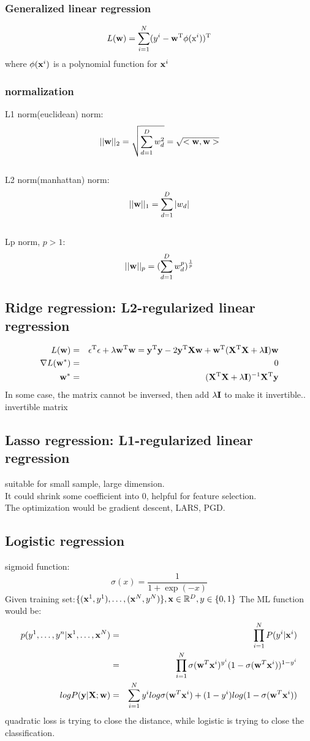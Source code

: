 \documentclass[12pt,a4paper]{article}
\begin{document}
\subsubsection*{Generalized linear regression}
$$
L({\bf w}) = \sum_{i=1}^{N}(y^i-{\bf w}^{\rm T}\phi({\rm x}^i))^{\rm T}
$$
where $\phi({\bf x}^i)$ is a polynomial function for ${\bf x}^i$
\subsubsection*{normalization}
L1 norm(euclidean) norm:
$$
||{\bf w}||_2 = \sqrt{\sum_{d=1}^{D}w_d^2}=\sqrt{<{\bf w},{\bf w}>}
$$\\
L2 norm(manhattan) norm:
$$
||{\bf w}||_1 = \sum_{d=1}^{D}|w_d|
$$\\
Lp norm, $p>1$:
$$
||{\bf w}||_p =(\sum_{d=1}^{D}w^p_d)^{\frac{1}{p}} 
$$
\subsection*{Ridge regression: L2-regularized linear regression}
\begin{eqnarray*}
L({\bf w}) &=& {\bf \epsilon}^{\rm T}{\bf \epsilon}+\lambda{\bf w}^{\rm T}{\bf w}={\bf y}^{\rm T}{\bf y}-2{\bf y}^{\rm T}{\bf X}{\bf w}+{\bf w}^{\rm T}({\bf X}^{\rm T}{\bf X}+\lambda{\bf I}){\bf w} \\
\nabla L({\bf w}^*) &=& 0 \\
{\bf w}^* &=& ({\bf X}^{\rm T}{\bf X}+\lambda{\bf I})^{-1}{\bf X}^{\rm T}{\bf y}
\end{eqnarray*}
In some case, the matrix cannot be inversed, then add $\lambda {\bf I}$ to make it invertible..\\
invertible matrix
\subsection*{Lasso regression: L1-regularized linear regression}
suitable for small sample, large dimension.\\
It could shrink some coefficient into 0, helpful for feature selection.\\
The optimization would be gradient descent, LARS, PGD.

\subsection*{Logistic regression}
sigmoid function:
$$
\sigma(x)=\frac{1}{1+\exp(-x)}
$$
Given training set:$\{({\bf x}^1,y^1),\ldots,({\bf x}^N,y^N)\},{\bf x} \in \mathbb{R}^D, y\in\{0,1\}$
The ML function would be:
\begin{eqnarray*}
p(y^1,\ldots,y^n|{\bf x}^1,\ldots,{\bf x}^N) &=& \prod_{i=1}^{N}P(y^i|{\bf x}^i)\\
&=& \prod_{i=1}^{N}\sigma({\bf w}^T{\bf x}^i)^{y^i}(1-\sigma({\bf w}^T{\bf x}^i))^{1-y^i}\\
logP({\bf y|X;w}) &=& \sum_{i=1}^{N}y^ilog\sigma({\bf w}^T{\bf x}^i)+(1-y^i)log(1-\sigma({\bf w}^T{\bf x}^i)) 
\end{eqnarray*}
quadratic loss is trying to close the distance, while logistic is trying to close the classification.
\end{document}
